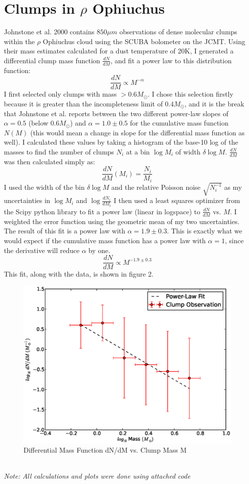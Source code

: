 \documentclass{article}
\begin{document}
\section{Clumps in $\rho$ Ophiuchus}
Johnstone et al. 2000 contains $850 \mu m$ observations of dense 
molecular clumps within the $\rho$ Ophiuchus cloud using the 
SCUBA bolometer on the JCMT.  Using their mass estimates calculated
for a dust temperature of 20K, I generated a differential clump
mass function $\frac{dN}{dM}$, and fit a power law to this distribution
function:
$$\frac{dN}{dM} \propto M^{-\alpha}$$
I first selected only clumps with mass $>0.6M_\odot$.  I chose this selection
firstly because it is greater than the incompleteness limit of $0.4M_\odot$, and
it is the break that Johnstone et al. reports between the two different
power-law slopes of $\alpha=0.5$ (below $0.6M_\odot$) and $\alpha=1.0\pm0.5$
for the cumulative mass function $N(M)$ (this would mean a change in slope for
the differential mass function as well).
I calculated these values by taking a histogram of the base-10 log of the masses
to find the number of clumps $N_i$ at a bin $\log M_i$ of width $\delta \log M$.
$\frac{dN}{dM}$ was then calculated simply as:
$$\frac{dN}{dM}(M_i) = \frac{N_i}{M_i}$$
I used the width of the bin $\delta \log M$ and the relative Poisson noise
$\sqrt{N_i^{-1}}$ as my uncertainties in $\log M_i$ and $\log \frac{dN_i}{dM_i}$
I then used a least squares optimizer from the Scipy python library to fit a
power law (linear in logspace) to $\frac{dN}{dM}$ vs. $M$.  I weighted the
error function using the geometric mean of my two uncertainties.
The result of this fit is a power law with $\alpha = 1.9 \pm 0.3$.  This is
exactly what we would expect if the cumulative mass function has a power law
with $\alpha = 1$, since the derivative will reduce $\alpha$ by one.
$$\frac{dN}{dM} \propto M^{-1.9\pm 0.3}$$
This fit, along with the data, is shown in figure 2.
\begin{figure}
	\includegraphics[scale=0.8]{clumpmass.eps}
	\caption{Differential Mass Function dN/dM vs. Clump Mass M}
\end{figure}\\
\textit{Note: All calculations and plots were done using attached code}
\end{document}
